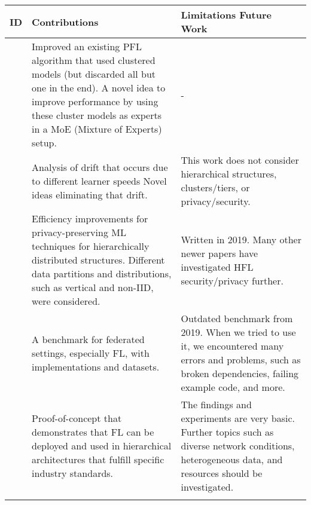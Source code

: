 \begin{changemargin}{-2cm}{0cm} 
    \begin{tabular}{|c||m{0.4\paperwidth}|m{0.4\paperwidth}|}
        \hline
            ID & Contributions & Limitations Future Work \\
        \hline
            \cite{paper:adaptive_exper_models_for_pfl}
            &
            Improved an existing PFL algorithm that used clustered models (but discarded all but one in the end).
            A novel idea to improve performance by using these cluster models as experts in a MoE (Mixture of Experts) setup.
            &
            -
        \\
        \hline
            \cite{paper:tackling_objective_inconsistency_problem_in_heterogeneous_fl}
            &
            Analysis of drift that occurs due to different learner speeds
            Novel ideas eliminating that drift.
            &
            This work does not consider hierarchical structures, clusters/tiers, or privacy/security.
        \\
        \hline
            \cite{paper:efficient_privacy_preserving_ml_in_hierarchical_distributed_systems}
            &
            Efficiency improvements for privacy-preserving ML techniques for hierarchically distributed structures.
            Different data partitions and distributions, such as vertical and non-IID, were considered.
            &
            Written in 2019.
            Many other newer papers have investigated HFL security/privacy further.
        \\
        \hline
            \cite{paper:leaf_fl_benchmark}
            &
            A benchmark for federated settings, especially FL, with implementations and datasets.
            &
            Outdated benchmark from 2019.
            When we tried to use it, we encountered many errors and problems, such as broken dependencies, failing example code, and more.
        \\
        \hline
            \cite{paper:deploying_fl_in_hierarchical_edge_architecture}
            &
            Proof-of-concept that demonstrates that FL can be deployed and used in hierarchical architectures that fulfill specific industry standards.
            &
            The findings and experiments are very basic.
            Further topics such as diverse network conditions, heterogeneous data, and resources should be investigated.
        \\
        \hline
            \cite{paper:hfl_with_momentum_acceleration_in_multi_tier_networks}

\end{tabular}
\end{changemargin}
